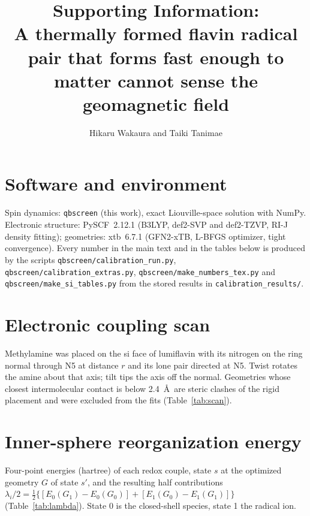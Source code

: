 \documentclass[11pt]{article}
\title{Supporting Information:\\ A thermally formed flavin radical pair that forms
fast enough to matter cannot sense the geomagnetic field}
\author{Hikaru Wakaura and Taiki Tanimae}
\date{}
\begin{document}
\maketitle

\section{Software and environment}
Spin dynamics: \texttt{qbscreen} (this work), exact Liouville-space solution with
NumPy. Electronic structure: PySCF~2.12.1 (B3LYP, def2-SVP and def2-TZVP, RI-J
density fitting); geometries: xtb~6.7.1 (GFN2-xTB, L-BFGS optimizer, tight
convergence). Every number in the main text and in the tables below is produced by
the scripts \texttt{qbscreen/calibration\_run.py},
\texttt{qbscreen/calibration\_extras.py}, \texttt{qbscreen/make\_numbers\_tex.py}
and \texttt{qbscreen/make\_si\_tables.py} from the stored results in
\texttt{calibration\_results/}.

\section{Electronic coupling scan}
Methylamine was placed on the si face of lumiflavin with its nitrogen on the ring
normal through N5 at distance $r$ and its lone pair directed at N5. Twist rotates
the amine about that axis; tilt tips the axis off the normal. Geometries whose
closest intermolecular contact is below 2.4~\AA\ are steric clashes of the rigid
placement and were excluded from the fits (Table~\ref{tab:scan}).

\begin{table}[h]\centering\small
\caption{Fragment-projection coupling $t$ between the flavin LUMO and the amine HOMO
(B3LYP/def2-SVP).}\label{tab:scan}

\end{table}

\section{Inner-sphere reorganization energy}
Four-point energies (hartree) of each redox couple, state $s$ at the optimized
geometry $G$ of state $s'$, and the resulting half contributions
$\lambda_i/2 = \tfrac12\{[E_0(G_1)-E_0(G_0)] + [E_1(G_0)-E_1(G_1)]\}$
(Table~\ref{tab:lambda}). State 0 is the closed-shell species, state 1 the radical
ion.

\begin{table}[h]\centering\small
\caption{Four-point energies (B3LYP/def2-SVP at GFN2-xTB geometries).}\label{tab:lambda}

\end{table}
\end{document}
